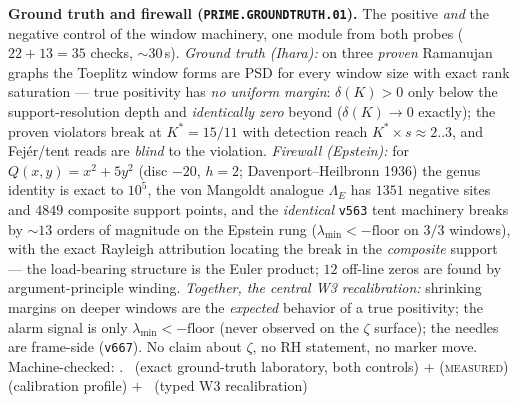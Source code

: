\documentclass[11pt,a4paper]{article}
\theoremstyle{definition}
\begin{document}
\par\smallskip\noindent\textbf{Ground truth and firewall
(\texttt{PRIME.GROUNDTRUTH.01}).}
The positive \emph{and} the negative control of the window
machinery, one module from both probes ($22+13=35$ checks,
${\sim}30$\,s).  \emph{Ground truth (Ihara):} on three \emph{proven}
Ramanujan graphs the Toeplitz window forms are PSD for every window
size with exact rank saturation --- true positivity has \emph{no
uniform margin}: $\delta(K)>0$ only below the support-resolution
depth and \emph{identically zero} beyond ($\delta(K)\to0$ exactly);
the proven violators break at $K^*=15/11$ with detection reach
$K^*\times s\approx2..3$, and Fej\'er/tent reads are \emph{blind} to
the violation.  \emph{Firewall (Epstein):} for
$Q(x,y)=x^2+5y^2$ (disc $-20$, $h=2$; Davenport--Heilbronn 1936) the
genus identity is exact to $10^5$, the von Mangoldt analogue
$\Lambda_E$ has $1351$ negative sites and $4849$ composite support
points, and the \emph{identical} \texttt{v563} tent machinery breaks
by ${\sim}13$ orders of magnitude on the Epstein rung
($\lambda_{\min}<-\mathrm{floor}$ on $3/3$ windows), with the exact
Rayleigh attribution locating the break in the \emph{composite}
support --- the load-bearing structure is the Euler product; $12$
off-line zeros are found by argument-principle winding.
\emph{Together, the central W3 recalibration:} shrinking margins on
deeper windows are the \emph{expected} behavior of a true
positivity; the alarm signal is only $\lambda_{\min}<-\mathrm{floor}$
(never observed on the $\zeta$ surface); the needles are frame-side
(\texttt{v667}).  No claim about $\zeta$, no RH statement, no marker
move.
Machine-checked: .
\mE\ (exact ground-truth laboratory, both controls) $+$
(\textsc{measured}) (calibration profile) $+$ \mC\ (typed W3
recalibration)
\par\smallskip
\end{document}
